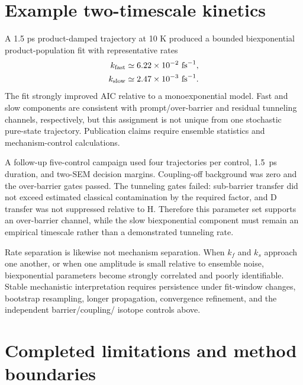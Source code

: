 \documentclass[11pt]{article}
\begin{document}
\clearpage
\section{Example two-timescale kinetics}

A 1.5 ps product-damped trajectory at 10 K produced a bounded
biexponential product-population fit with representative rates
\begin{align}
  k_{\rm fast} &\simeq 6.22\times10^{-2}\ \mathrm{fs}^{-1},\\
  k_{\rm slow} &\simeq 2.47\times10^{-3}\ \mathrm{fs}^{-1}.
\end{align}
The fit strongly improved AIC relative to a monoexponential model. Fast and slow
components are consistent with prompt/over-barrier and residual tunneling
channels, respectively, but this assignment is not unique from one stochastic
pure-state trajectory. Publication claims require ensemble statistics and
mechanism-control calculations.

A follow-up five-control campaign used four trajectories per control, 1.5~ps
duration, and two-SEM decision margins. Coupling-off background was zero and
the over-barrier gates passed. The tunneling gates failed: sub-barrier transfer
did not exceed estimated classical contamination by the required factor, and D
transfer was not suppressed relative to H. Therefore this parameter set supports
an over-barrier channel, while the slow biexponential component must remain an
empirical timescale rather than a demonstrated tunneling rate.

Rate separation is likewise not mechanism separation. When $k_f$ and $k_s$ approach
one another, or when one amplitude is small relative to ensemble noise, biexponential
parameters become strongly correlated and poorly identifiable. Stable mechanistic
interpretation requires persistence under fit-window changes, bootstrap resampling,
longer propagation, convergence refinement, and the independent barrier/coupling/
isotope controls above.

\section{Completed limitations and method boundaries}
\end{document}
